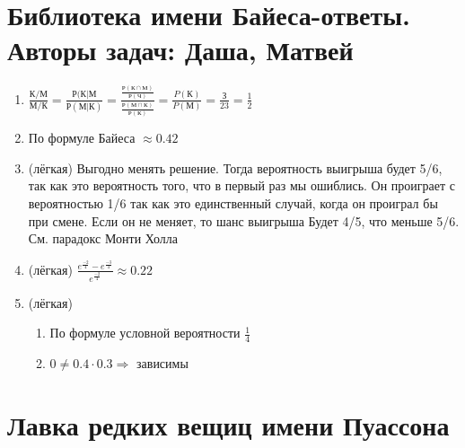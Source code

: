 \documentclass[a4paper,12pt]{article}
\begin{document}
\newpage
\section{Библиотека имени Байеса-ответы. Авторы задач: Даша, Матвей}


\begin{enumerate}
\item
$\frac{К/М}{М/К} = \frac{Р(К|М}{Р(М|К)} = \frac{\frac{Р(К\cap М)}{Р(Ч)}}{\frac{Р(М\cap К)}{Р(К)}} = \frac{P(К)}{P(М)} = \frac{З}{23} = \frac{1}{2}$
\item По формуле Байеса $\approx 0.42$
\item (лёгкая)
Выгодно менять решение. Тогда вероятность выигрыша будет 5/6, так как это вероятность того, что в первый раз мы ошиблись. Он проиграет с вероятностью 1/6 так как это единственный случай, когда он проиграл бы при смене. Если он не меняет, то шанс выигрыша Будет 4/5, что меньше 5/6. См. парадокс Монти Холла
\item (лёгкая)
$\frac{e^{\frac{-2}{4}} - e^{\frac{-3}{4}}}{e^{\frac{-2}{4}}} \approx 0.22$
\item (лёгкая)
\begin{enumerate}
\item По формуле условной вероятности $\frac{1}{4}$\\
\item $0 \neq 0.4 \cdot 0.3 \Rightarrow$ зависимы
\end{enumerate}
\end{enumerate}

\newpage
\section{Лавка редких вещиц имени Пуассона} %
\end{document}
